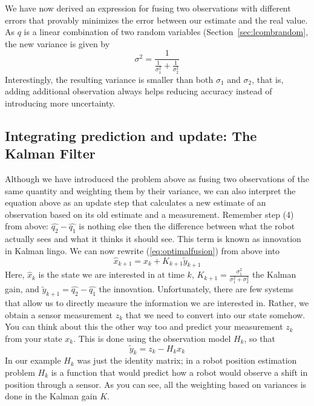 We have now derived an expression for fusing two observations with different errors that provably minimizes the error between our estimate and the real value. As $q$ is a linear combination of two random variables (Section~\ref{sec:lcombrandom}, the new variance is given by
\begin{equation}
\sigma^2=\frac{1}{\frac{1}{\sigma_1^2}+\frac{1}{\sigma_2^2}}
\end{equation}
Interestingly, the resulting variance is smaller than both $\sigma_1$ and $\sigma_2$, that is, adding additional observation always helps  reducing accuracy instead of introducing more uncertainty.

\subsection{Integrating prediction and update: The Kalman Filter}
Although we have introduced the problem above as fusing two observations of the same quantity and weighting them by their variance, we can also interpret the equation above as an update step that calculates a new estimate of an observation based on its old estimate and a measurement. Remember step (4) from above: $ \hat{q_2}-\hat{q_1}$ is nothing else then the difference between what the robot actually sees and what it thinks it should see. This term is known as innovation in Kalman lingo. We can now
rewrite (\ref{eq:optimalfusion}) from above into
\begin{equation}
\hat{x}_{k+1}=\hat{x}_k+K_{k+1}\tilde{y}_{k+1}
\end{equation}
Here, $ \hat{x}_k$ is the state we are interested in at time $ k$, $ K_{k+1}=\frac{\sigma_1^2}{\sigma_1^2+\sigma_2^2}$ the Kalman gain, and $ \tilde{y}_{k+1}=\hat{q_2}-\hat{q_1}$  the innovation. Unfortunately, there are few systems that allow us to directly measure the information we are interested in. Rather, we obtain a sensor measurement $ z_k$ that we need to convert into our state somehow. You can think about this the other way too and predict your measurement $ z_k$ from your state $ x_k$. This is done using the observation model $ H_k$, so that
\begin{equation}
\tilde{y}_{k}=z_k-H_k x_k
\end{equation}
In our example $ H_k$ was just the identity matrix; in a robot position estimation problem $ H_k$ is a function that would predict how a robot would observe a shift in position through a sensor. As you can see, all the weighting based on variances is done in the Kalman gain $ K$.
